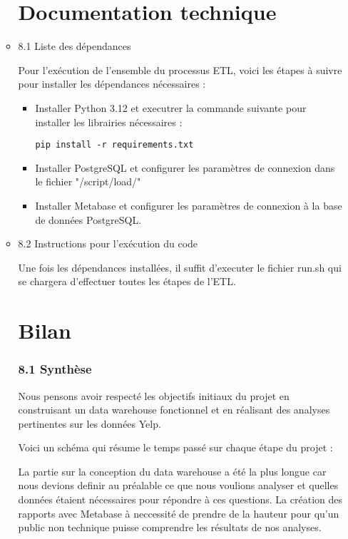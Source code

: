 \begin{itemize}
\begin{itemize}
\chapter*{Documentation technique}



\item 8.1 Liste des dépendances

Pour l’exécution de l'ensemble du processus ETL, voici les étapes à suivre pour installer les dépendances nécessaires :

\begin{itemize}
\item Installer Python 3.12 et executrer la commande suivante pour installer les librairies nécessaires :

\begin{verbatim}
pip install -r requirements.txt
\end{verbatim}

\item Installer PostgreSQL et configurer les paramètres de connexion dans le fichier "/script/load/"

\item Installer Metabase et configurer les paramètres de connexion à la base de données PostgreSQL.
\end{itemize}


\item 8.2 Instructions pour l’exécution du code

Une fois les dépendances installées, il suffit d'executer le fichier run.sh qui se chargera d'effectuer toutes les étapes de l'ETL.


\chapter*{Bilan}

\subsection{8.1 Synthèse}

Nous pensons avoir respecté les objectifs initiaux du projet en construisant un data warehouse fonctionnel et en réalisant des analyses pertinentes sur les données Yelp.

Voici un schéma qui résume le temps passé sur chaque étape du projet :


La partie sur la conception du data warehouse a été la plus longue car nous devions definir au préalable ce que nous voulions analyser et quelles données étaient nécessaires pour répondre à ces questions.
La création des rapports avec Metabase à neccessité de prendre de la hauteur pour qu'un public non technique puisse comprendre les résultats de nos analyses.



\end{itemize}
\end{itemize}

